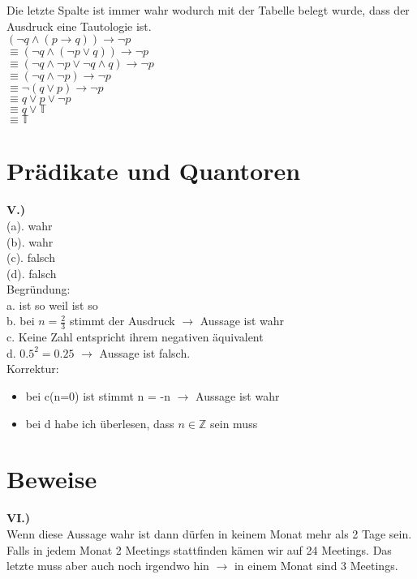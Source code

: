 \documentclass[12pt]{scrartcl}
\begin{document}
Die letzte Spalte ist immer wahr wodurch mit der Tabelle belegt wurde,
dass der Ausdruck eine Tautologie ist. \\

$(\lnot q \land (p \rightarrow q)) \rightarrow \lnot p$\\
$\equiv (\lnot q \land (\lnot p \lor q)) \rightarrow \lnot p$\\
$\equiv (\lnot q \land \lnot p \lor \lnot q \land q) \rightarrow \lnot p$\\
$\equiv (\lnot q \land \lnot p) \rightarrow \lnot p$\\
$\equiv \lnot(q \lor p) \rightarrow \lnot p$\\
$\equiv q \lor p \lor \lnot p$\\
$\equiv q \lor \mathbb{T}$\\
$\equiv \mathbb{T}$\\

\newpage
\section{Prädikate und Quantoren}


\textbf{V.)}\\
(a). wahr\\
(b). wahr\\
(c). falsch\\       
(d). falsch\\
Begründung:\\
a. ist so weil ist so\\
b. bei $n = \frac{2}{3}$ stimmt der Ausdruck $\rightarrow$ Aussage ist wahr\\
c. Keine Zahl entspricht ihrem negativen äquivalent\\
d. $0.5^2 = 0.25$ $\rightarrow$ Aussage ist falsch.\\


Korrektur:
\begin{itemize}
    \item bei c(n=0) ist stimmt n = -n $\rightarrow$ Aussage ist wahr
    \item bei d habe ich überlesen, dass $n \in \mathbb{Z}$ sein muss
\end{itemize}


\section{Beweise}

\textbf{VI.)}\\
Wenn diese Aussage wahr ist dann dürfen in keinem Monat mehr als 2 Tage sein.
Falls in jedem Monat 2 Meetings stattfinden kämen wir auf 24 Meetings. Das letzte muss aber
auch noch irgendwo hin $\rightarrow$ in einem Monat sind 3 Meetings.
\end{document}
